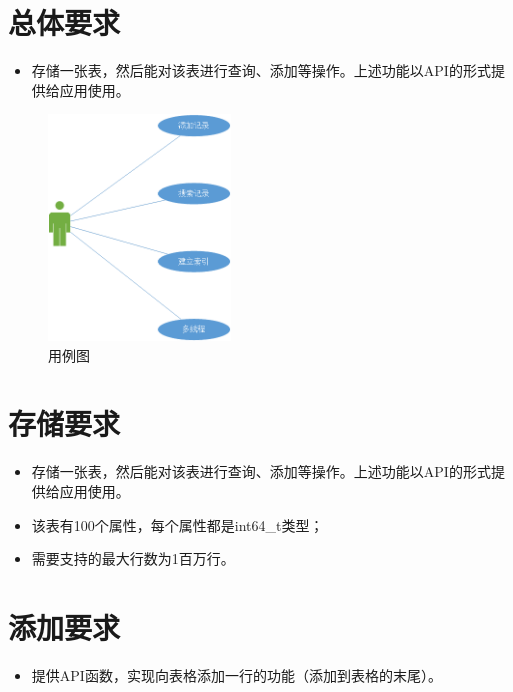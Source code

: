 \documentclass[bachelor]{thesis-uestc}
\begin{document}
\thesistableofcontents

\thesischapterexordium %

\section{总体要求}
\begin{itemize}
	\item 存储一张表，然后能对该表进行查询、添加等操作。上述功能以API的形式提供给应用使用。
\end{itemize}

\begin{figure}[htbp]
	\centering\includegraphics[height=6cm]{images/use_case.png}
	\caption{用例图}
	\label{fig:use_case}
\end{figure}

\section{存储要求}
\begin{itemize}
	\item 存储一张表，然后能对该表进行查询、添加等操作。上述功能以API的形式提供给应用使用。
	\item 该表有100个属性，每个属性都是int64\_t类型；
	\item 需要支持的最大行数为1百万行。
\end{itemize}

\section{添加要求}
\begin{itemize}
	\item 提供API函数，实现向表格添加一行的功能（添加到表格的末尾）。
\end{itemize}
\end{document}
